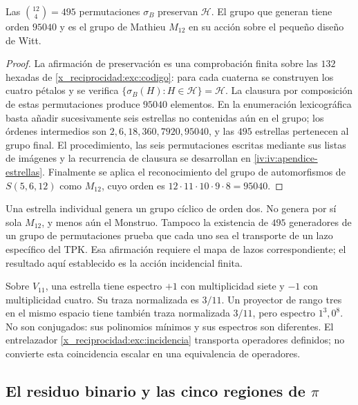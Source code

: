 \begin{proposition}
\label{x_reciprocidad:exc:m12}
Las $\binom{12}4=495$ permutaciones $\sigma_B$ preservan $\mathcal H$.
El grupo que generan tiene orden $95040$ y es el grupo de Mathieu
$M_{12}$ en su acción sobre el pequeño diseño de Witt.
\end{proposition}

\begin{proof}
La afirmación de preservación es una comprobación finita sobre las
$132$ hexadas de \eqref{x_reciprocidad:exc:codigo}: para cada cuaterna se construyen
los cuatro pétalos y se verifica
$\{\sigma_B(H):H\in\mathcal H\}=\mathcal H$.
La clausura por composición de estas permutaciones produce $95040$
elementos. En la enumeración lexicográfica basta añadir sucesivamente
seis estrellas no contenidas aún en el grupo; los órdenes intermedios
son $2,6,18,360,7920,95040$, y las $495$ estrellas pertenecen al grupo
final. El procedimiento, las seis permutaciones escritas mediante sus
listas de imágenes y la recurrencia de clausura se desarrollan en
\ref{iv:iv:apendice-estrellas}. Finalmente se aplica el reconocimiento
del grupo de automorfismos de $S(5,6,12)$ como $M_{12}$, cuyo orden es
$12\cdot11\cdot10\cdot9\cdot8=95040$.
\end{proof}

Una estrella individual genera un grupo cíclico de orden dos. No
genera por sí sola $M_{12}$, y menos aún el Monstruo. Tampoco la
existencia de $495$ generadores de un grupo de permutaciones prueba que
cada uno sea el transporte de un lazo específico del TPK. Esa afirmación
requiere el mapa de lazos correspondiente; el resultado aquí establecido
es la acción incidencial finita.

\begin{remark}
Sobre $V_{11}$, una estrella tiene espectro $+1$ con multiplicidad siete
y $-1$ con multiplicidad cuatro. Su traza normalizada es $3/11$.
Un proyector de rango tres en el mismo espacio tiene también traza
normalizada $3/11$, pero espectro $1^3,0^8$. No son conjugados: sus
polinomios mínimos y sus espectros son diferentes. El entrelazador
\eqref{x_reciprocidad:exc:incidencia} transporta operadores definidos; no convierte
esta coincidencia escalar en una equivalencia de operadores.
\end{remark}

\subsection{El residuo binario y las cinco regiones de \texorpdfstring{$\pi$}{pi}}
\label{x_reciprocidad:exc:cinco-regiones}

